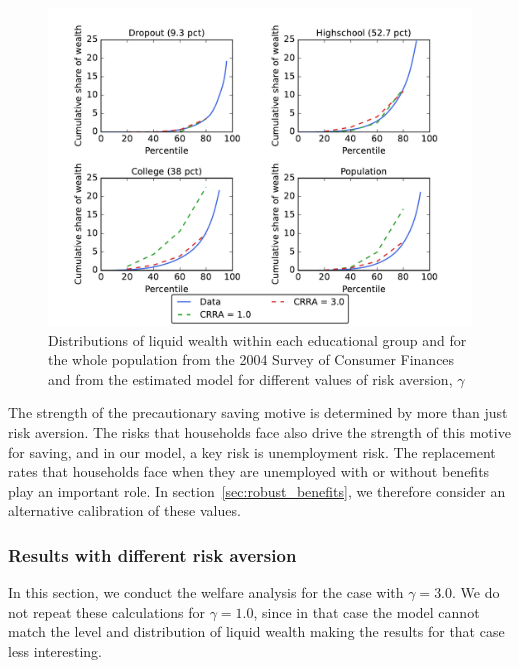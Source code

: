 \documentclass[\econtexRoot/HAFiscal]{subfiles}
\begin{document}
\begin{figure}[th]
  \begin{center}
    \includegraphics[width=.9\textwidth]{../Figures/LorenzPoints_robustness_CRRA.pdf}
    \caption{Distributions of liquid wealth within each educational group and for the whole population from the 2004 Survey of Consumer Finances and from the estimated model for different values of risk aversion, $\gamma$}
    \notinsubfile{\label{fig:LorenzPts_robustness_CRRA}}
  \end{center}
\end{figure}

The strength of the precautionary saving motive is determined by more than just risk aversion.
The risks that households face also drive the strength of this motive for saving, and in our model, a key risk is unemployment risk.
The replacement rates that households face when they are unemployed with or without benefits play an important role.
In section~\ref{sec:robust_benefits}, we therefore consider an alternative calibration of these values.


\subsubsection{Results with different risk aversion}
\notinsubfile{\label{sec:robust_gamma_results}}

In this section, we conduct the welfare analysis for the case with $\gamma=3.0$.
We do not repeat these calculations for $\gamma=1.0$, since in that case the model cannot match the level and distribution of liquid wealth making the results for that case less interesting.
\end{document}
